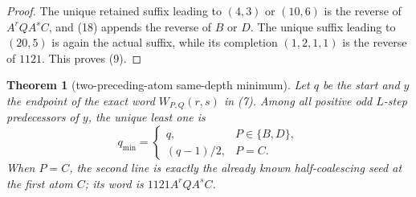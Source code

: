 \documentclass[11pt]{article}
\newtheorem{theorem}{Theorem}
\begin{document}
\begin{proof}
The unique retained suffix leading to $(4,3)$ or $(10,6)$ is the reverse
of $A^rQA^sC$, and (18) appends the reverse of $B$ or $D$.  The unique
suffix leading to $(20,5)$ is again the actual suffix, while its
completion $(1,2,1,1)$ is the reverse of $1121$.  This proves (9).
\end{proof}

\begin{theorem}[two-preceding-atom same-depth minimum]
Let $q$ be the start and $y$ the endpoint of the exact word
$W_{P,Q}(r,s)$ in (7).  Among all positive odd $L$-step predecessors of
$y$, the unique least one is
\[
 \boxed{
 q_{\min}=
 \begin{cases}
 q,&P\in\{B,D\},\\[1mm]
 (q-1)/2,&P=C.
 \end{cases}}
 \tag{20}
\]
When $P=C$, the second line is exactly the already known half-coalescing
seed at the first atom $C$; its word is $1121A^rQA^sC$.
\end{theorem}
\end{document}
